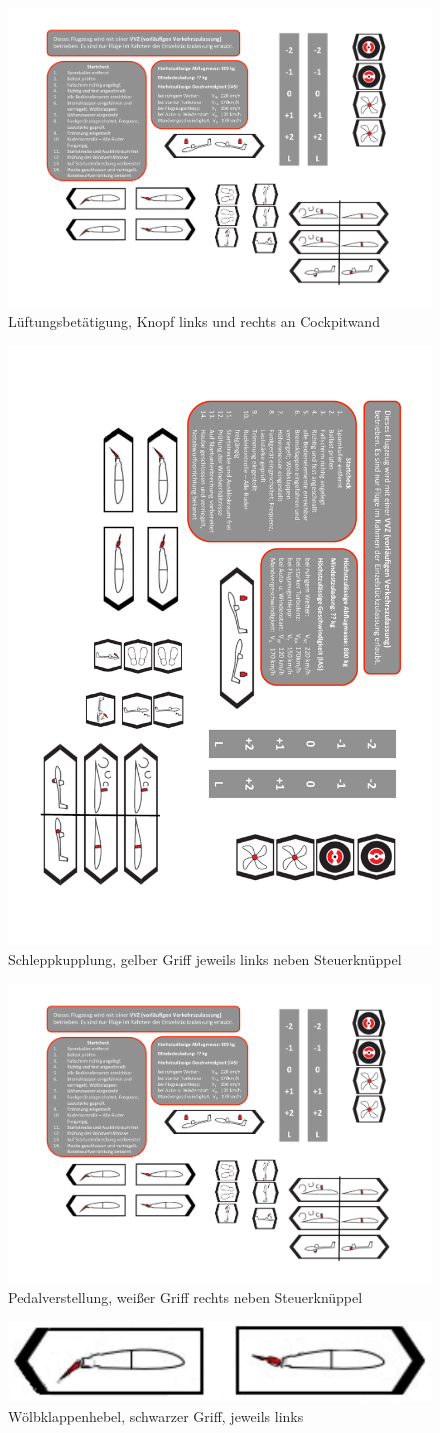 \begin{figure}[h]
\begin{center}
\includegraphics[width=.15\textwidth]{bilder/lueftung.pdf}
\caption*{Lüftungsbetätigung, Knopf links und rechts an Cockpitwand}
\end{center}
\end{figure}

\begin{figure}[h]
\begin{center}
\includegraphics[width=.15\textwidth]{bilder/kupplung.pdf}
\caption*{Schleppkupplung, gelber Griff jeweils links neben Steuerknüppel}
\end{center}
\end{figure}

\begin{figure}[h]
\begin{center}
\includegraphics[width=.15\textwidth]{bilder/pedale.pdf}
\caption*{Pedalverstellung, weißer Griff rechts neben Steuerknüppel}
\end{center}
\end{figure}

\begin{figure}[ht]
\begin{center}
\includegraphics[width=.45\textwidth]{bilder/wk.pdf}
\caption*{Wölbklappenhebel, schwarzer Griff, jeweils links}
\end{center}
\end{figure}

